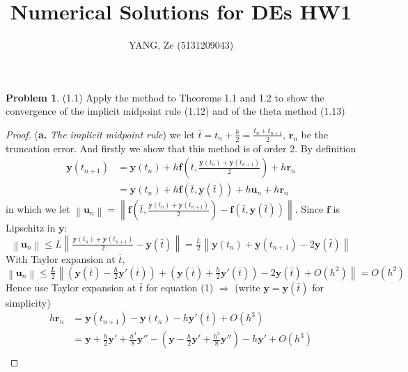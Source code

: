 \documentclass[a4paper, 10pt]{article}
\title{\textbf{Numerical Solutions for DEs HW1}}
\author{YANG, Ze (5131209043)}
\theoremstyle{definition}
\newtheorem{problem}{Problem}
\theoremstyle{hSol}
\begin{document}
\maketitle


\begin{problem} (1.1) Apply the method to Theorems 1.1 and 1.2 to show the convergence of the implicit midpoint rule (1.12) and of the theta method (1.13)
\end{problem}
\begin{proof} (\textbf{a.} \emph{The implicit midpoint rule}) we let $\bar{t}=t_n+\frac{h}{2}=\frac{t_n+t_{n+1}}{2}$, $\bm{r}_n$ be the truncation error. And firstly we show that this method is of order 2. By definition
\begin{equation}
  \begin{split}
      \bm{y}(t_{n+1}) &= \bm{y}(t_n) + h \bm{f}(\bar{t}, \tfrac{\bm{y}(t_n)+\bm{y}(t_{n+1})}{2}) + h \bm{r}_n \\
      &= \bm{y}(t_n) + h \bm{f}(\bar{t}, \bm{y}(\bar{t})) + h \bm{u}_n + h \bm{r}_n 
  \end{split}
\end{equation}
in which we let $\left\|\bm{u}_n\right\|= \left\|\bm{f}(\bar{t}, \tfrac{\bm{y}(t_n)+\bm{y}(t_{n+1})}{2})- \bm{f}(\bar{t}, \bm{y}(\bar{t}))\right\|$. Since $\bm{f}$ is Lipschitz in $\bm{y}$:
\begin{equation}
  \left\|\bm{u}_n\right\| \leq L \left\|\tfrac{\bm{y}(t_n)+\bm{y}(t_{n+1})}{2}-\bm{y}(\bar{t})\right\| = \tfrac{L}{2} \left\|\bm{y}(t_n)+\bm{y}(t_{n+1})-2 \bm{y}(\bar{t})\right\|
\end{equation}
With Taylor expansion at $\bar{t}$,
\begin{equation}
  \left\|\bm{u}_n\right\| \leq \tfrac{L}{2} \left\|(\bm{y}(\bar{t})-\tfrac{h}{2}\bm{y}'(\bar{t}))+(\bm{y}(\bar{t})+\tfrac{h}{2}\bm{y}'(\bar{t}))-2 \bm{y}(\bar{t})+O(h^2)\right\| = O(h^2)
\end{equation}
Hence use Taylor expansion at $\bar{t}$ for equation (1) $\Rightarrow$ (write $\bm{y}=\bm{y}(\bar{t})$ for simplicity)
\begin{equation}
  \begin{split}
    h \bm{r}_n &= \bm{y}(t_{n+1}) - \bm{y}(t_n) - h \bm{y}'(\bar{t}) + O(h^3) \\
    &= \bm{y} + \tfrac{h}{2}\bm{y}' + \tfrac{h^2}{8}\bm{y}'' - (\bm{y}-\tfrac{h}{2}\bm{y}' + \tfrac{h^2}{8}\bm{y}'') - h \bm{y}' + O(h^3)  \\

\end{split}
\end{equation}
\end{proof}
\end{document}
